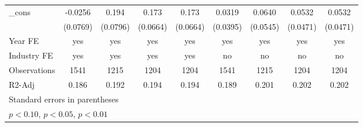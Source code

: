 \begin{table}[htbp]
\begin{tabular}{l*{8}{c}}
\_cons              &     -0.0256         &       0.194\sym{**} &       0.173\sym{**} &       0.173\sym{**} &      0.0319         &      0.0640         &      0.0532         &      0.0532         \\
                    &    (0.0769)         &    (0.0796)         &    (0.0664)         &    (0.0664)         &    (0.0395)         &    (0.0545)         &    (0.0471)         &    (0.0471)         \\
\hline
Year FE             &         yes         &         yes         &         yes         &         yes         &         yes         &         yes         &         yes         &         yes         \\
Industry FE         &         yes         &         yes         &         yes         &         yes         &          no         &          no         &          no         &          no         \\
Observations        &        1541         &        1215         &        1204         &        1204         &        1541         &        1215         &        1204         &        1204         \\
R2-Adj              &       0.186         &       0.192         &       0.194         &       0.194         &       0.189         &       0.201         &       0.202         &       0.202         \\
\hline\hline
\multicolumn{9}{l}{\footnotesize Standard errors in parentheses}\\
\multicolumn{9}{l}{\footnotesize \sym{*} \(p<0.10\), \sym{**} \(p<0.05\), \sym{***} \(p<0.01\)}\\
\end{tabular}
\end{table}

